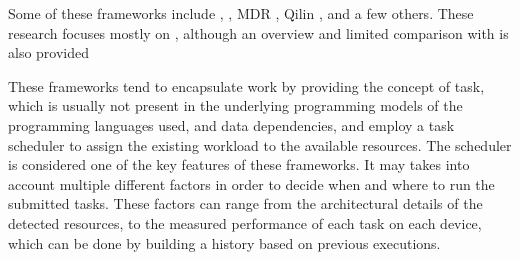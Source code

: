 \documentclass[main.tex]{subfiles}
\begin{document}
Some of these frameworks include \gama \cite{joao2012gama}, \starpu \cite{augonnet2011starpu}, MDR \cite{linderman2008merge}, Qilin \cite{luk2009qilin}, and a few others. These research focuses mostly on \starpu, although an overview and limited comparison with \gama is also provided

These frameworks tend to encapsulate work by providing the concept of task, which is usually not present in the underlying programming models of the programming languages used, and data dependencies, and employ a task scheduler to assign the existing workload to the available resources.
The scheduler is considered one of the key features of these  frameworks. It may takes into account multiple different factors in order to decide when and where to run the submitted tasks. These factors can range from the architectural details of the detected resources, to the measured performance of each task on each device, which can be done by building a history based on previous executions.



\end{document}
